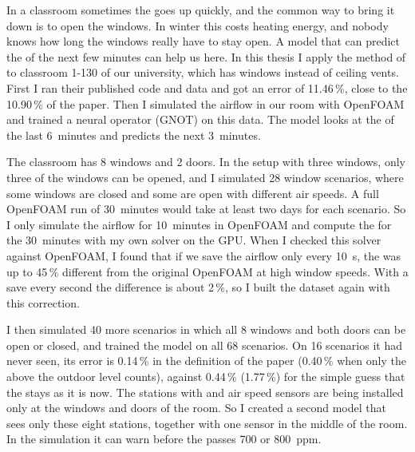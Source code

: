 In a classroom sometimes the \cotwo{} goes up quickly, and the common way to bring it down is to open the windows.
In winter this costs heating energy, and nobody knows how long the windows really have to stay open. A model
that can predict the \cotwo{} of the next few minutes can help us here. In this thesis I apply the method of
\citet{bian2025} to classroom 1-130 of our university, which has windows instead of ceiling vents. First I ran
their published code and data and got an error of 11.46\,\%, close to the 10.90\,\% of the paper. Then I
simulated the airflow in our room with OpenFOAM and trained a neural operator (GNOT) on this data. The model
looks at the \cotwo{} of the last 6~minutes and predicts the next 3~minutes.

The classroom has 8 windows and 2 doors. In the setup with three windows, only three of the windows can be opened, and I
simulated 28 window scenarios, where some windows are closed and some are open with different air speeds. A
full OpenFOAM run of 30~minutes would take at least two days for each scenario. So I only simulate the airflow
for 10~minutes in OpenFOAM and compute the \cotwo{} for the 30~minutes with my own \cotwo{} solver on the GPU.
When I checked this solver against OpenFOAM, I found that if we save the airflow only every 10~s, the \cotwo{}
was up to 45\,\% different from the original OpenFOAM \cotwo{} at high window speeds. With a save every second the difference is about 2\,\%, so I
built the dataset again with this correction.

I then simulated 40 more scenarios in which all 8 windows and both doors can be open or closed, and trained the
model on all 68 scenarios. On 16 scenarios it had never seen, its error is 0.14\,\% in the definition of the paper
(0.40\,\% when only the \cotwo{} above the outdoor level counts), against 0.44\,\% (1.77\,\%) for
the simple guess that the \cotwo{} stays as it is now. The stations with \cotwo{} and air speed sensors are being installed only at the windows and
doors of the room. So I created a second model that sees only these eight stations, together with one \cotwo{}
sensor in the middle of the room. In the simulation it can warn before the \cotwo{} passes 700 or 800~ppm.
